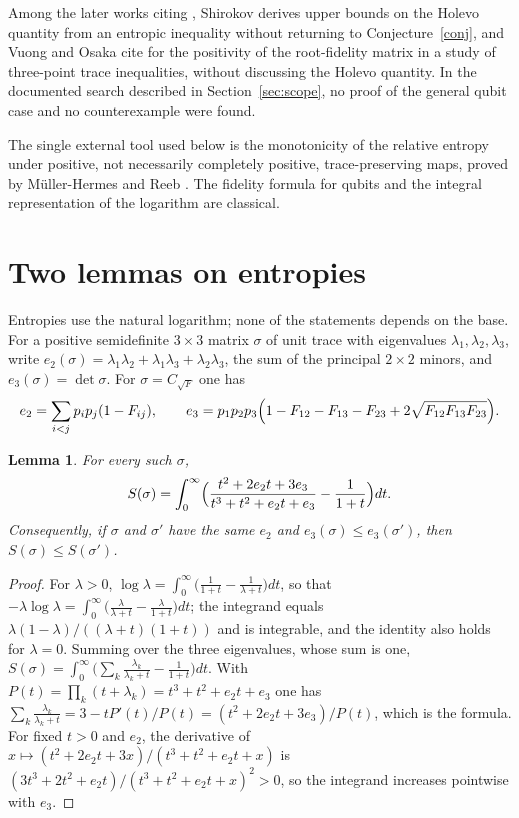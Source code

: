 \documentclass[11pt,a4paper]{article}
\newtheorem{lemma}[theorem]{Lemma}
\theoremstyle{definition}
\theoremstyle{plain}
\newcommand{\CF}{C_{\sqrt F}}
\begin{document}
Among the later works citing \cite{FdMRZ2012}, Shirokov \cite{Shirokov2025}
derives upper bounds on the Holevo quantity from an entropic inequality
without returning to Conjecture~\ref{conj}, and Vuong and Osaka
\cite{VuongOsaka2026} cite \cite{FdMRZ2012} for the positivity of the
root-fidelity matrix in a study of three-point trace inequalities, without
discussing the Holevo quantity. In the documented search described in
Section~\ref{sec:scope}, no proof of the general qubit case and no
counterexample were found.

The single external tool used below is the monotonicity of the relative
entropy under positive, not necessarily completely positive, trace-preserving
maps, proved by M\"uller-Hermes and Reeb \cite{MHR2017}. The fidelity formula
for qubits and the integral representation of the logarithm are classical.

\section{Two lemmas on entropies}
Entropies use the natural logarithm; none of the statements depends on the
base. For a positive semidefinite $3\times3$ matrix $\sigma$ of unit trace
with eigenvalues $\lambda_1,\lambda_2,\lambda_3$, write
$e_2(\sigma)=\lambda_1\lambda_2+\lambda_1\lambda_3+\lambda_2\lambda_3$, the sum
of the principal $2\times2$ minors, and $e_3(\sigma)=\det\sigma$. For
$\sigma=\CF$ one has
\begin{equation}\label{eq:e2e3}
e_2=\sum_{i<j}p_ip_j(1-F_{ij}),\qquad
e_3=p_1p_2p_3\Bigl(1-F_{12}-F_{13}-F_{23}+2\sqrt{F_{12}F_{13}F_{23}}\Bigr).
\end{equation}

\begin{lemma}\label{lem:int}
For every such $\sigma$,
\[
S(\sigma)=\int_0^\infty\Bigl(\frac{t^2+2e_2t+3e_3}{t^3+t^2+e_2t+e_3}-\frac1{1+t}\Bigr)dt .
\]
Consequently, if $\sigma$ and $\sigma'$ have the same $e_2$ and
$e_3(\sigma)\le e_3(\sigma')$, then $S(\sigma)\le S(\sigma')$.
\end{lemma}

\begin{proof}
For $\lambda>0$, $\log\lambda=\int_0^\infty\bigl(\frac1{1+t}-\frac1{\lambda+t}\bigr)dt$,
so that $-\lambda\log\lambda=\int_0^\infty\bigl(\frac{\lambda}{\lambda+t}-\frac{\lambda}{1+t}\bigr)dt$;
the integrand equals $\lambda(1-\lambda)/((\lambda+t)(1+t))$ and is integrable,
and the identity also holds for $\lambda=0$. Summing over the three eigenvalues,
whose sum is one,
$S(\sigma)=\int_0^\infty\bigl(\sum_k\frac{\lambda_k}{\lambda_k+t}-\frac1{1+t}\bigr)dt$.
With $P(t)=\prod_k(t+\lambda_k)=t^3+t^2+e_2t+e_3$ one has
$\sum_k\frac{\lambda_k}{\lambda_k+t}=3-tP'(t)/P(t)=(t^2+2e_2t+3e_3)/P(t)$, which
is the formula. For fixed $t>0$ and $e_2$, the derivative of
$x\mapsto(t^2+2e_2t+3x)/(t^3+t^2+e_2t+x)$ is
$(3t^3+2t^2+e_2t)/(t^3+t^2+e_2t+x)^2>0$, so the integrand increases pointwise
with $e_3$.
\end{proof}
\end{document}

